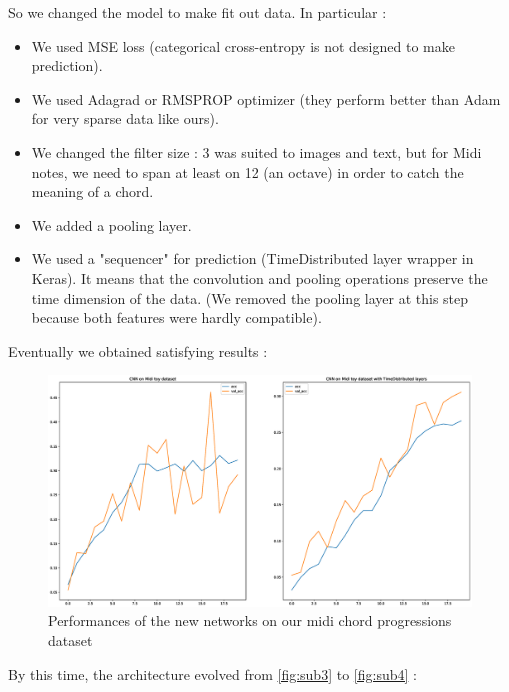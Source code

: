 \documentclass{article}
\begin{document}
So we changed the model to make fit out data. In particular :

\begin{itemize}
\item We used MSE loss (categorical cross-entropy is not designed to make prediction).
\item We used Adagrad or RMSPROP optimizer (they perform better than Adam for very sparse data like ours).
\item We changed the filter size : 3 was suited to images and text, but for Midi notes, we need to span at least on 12 (an octave) in order to catch the meaning of a chord.
\item We added a pooling layer.
\item We used a "sequencer" for prediction (TimeDistributed layer wrapper in Keras). It means that the convolution and pooling operations preserve the time dimension of the data. (We removed the pooling layer at this step because both features were hardly compatible).
\end{itemize}

Eventually we obtained satisfying results :

\begin{figure}[H]
\centering
\includegraphics[width =1\textwidth]{MidiCNN.eps}
\caption{Performances of the new networks on our midi chord progressions dataset}
\label{rnnmidi}
\end{figure}

By this time, the architecture evolved from \ref{fig:sub3} to \ref{fig:sub4} :
\end{document}
